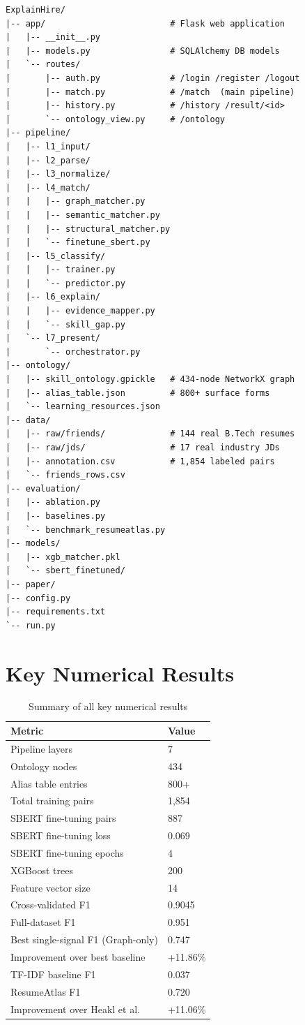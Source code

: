 \documentclass[12pt,a4paper]{report}
\begin{document}
\begin{lstlisting}[language={}]
ExplainHire/
|-- app/                         # Flask web application
|   |-- __init__.py
|   |-- models.py                # SQLAlchemy DB models
|   `-- routes/
|       |-- auth.py              # /login /register /logout
|       |-- match.py             # /match  (main pipeline)
|       |-- history.py           # /history /result/<id>
|       `-- ontology_view.py     # /ontology
|-- pipeline/
|   |-- l1_input/
|   |-- l2_parse/
|   |-- l3_normalize/
|   |-- l4_match/
|   |   |-- graph_matcher.py
|   |   |-- semantic_matcher.py
|   |   |-- structural_matcher.py
|   |   `-- finetune_sbert.py
|   |-- l5_classify/
|   |   |-- trainer.py
|   |   `-- predictor.py
|   |-- l6_explain/
|   |   |-- evidence_mapper.py
|   |   `-- skill_gap.py
|   `-- l7_present/
|       `-- orchestrator.py
|-- ontology/
|   |-- skill_ontology.gpickle   # 434-node NetworkX graph
|   |-- alias_table.json         # 800+ surface forms
|   `-- learning_resources.json
|-- data/
|   |-- raw/friends/             # 144 real B.Tech resumes
|   |-- raw/jds/                 # 17 real industry JDs
|   |-- annotation.csv           # 1,854 labeled pairs
|   `-- friends_rows.csv
|-- evaluation/
|   |-- ablation.py
|   |-- baselines.py
|   `-- benchmark_resumeatlas.py
|-- models/
|   |-- xgb_matcher.pkl
|   `-- sbert_finetuned/
|-- paper/
|-- config.py
|-- requirements.txt
`-- run.py
\end{lstlisting}

\chapter{Key Numerical Results}

\begin{table}[h]
\centering
\caption{Summary of all key numerical results}
\begin{tabular}{ll}
\toprule
\textbf{Metric} & \textbf{Value} \\
\midrule
Pipeline layers & 7 \\
Ontology nodes & 434 \\
Alias table entries & 800+ \\
Total training pairs & 1,854 \\
SBERT fine-tuning pairs & 887 \\
SBERT fine-tuning loss & 0.069 \\
SBERT fine-tuning epochs & 4 \\
XGBoost trees & 200 \\
Feature vector size & 14 \\
Cross-validated F1 & 0.9045 \\
Full-dataset F1 & 0.951 \\
Best single-signal F1 (Graph-only) & 0.747 \\
Improvement over best baseline & +11.86\% \\
TF-IDF baseline F1 & 0.037 \\
ResumeAtlas F1 & 0.720 \\
Improvement over Heakl et al. & +11.06\% \\
\bottomrule
\end{tabular}
\end{table}
\end{document}
